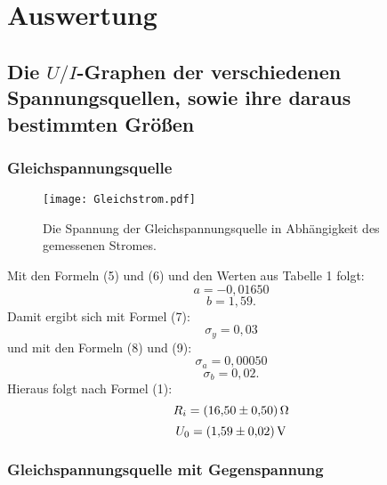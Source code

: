 \section{Auswertung}
\label{sec:Auswertung}



\subsection{Die $U/I$-Graphen der verschiedenen Spannungsquellen, sowie ihre daraus bestimmten Größen}

\subsubsection{Gleichspannungsquelle}
\begin{figure}[H]
	\centering
	\caption{Die Spannung der Gleichspannungsquelle in Abhängigkeit des gemessenen Stromes.}
	\texttt{[image: Gleichstrom.pdf]}
	\label{fig:Gleichstrom}
\end{figure}



Mit den Formeln (5) und (6) und den Werten aus Tabelle 1 folgt:
\begin{displaymath}
	a=-0,01650
\end{displaymath}
\begin{displaymath}
	b=1,59\text{.}
\end{displaymath}
Damit ergibt sich mit Formel (7):
\begin{displaymath}
	\sigma_y=0,03
\end{displaymath}
und mit den Formeln (8) und (9):
\begin{displaymath}
	\sigma_a=0,00050
\end{displaymath}
\begin{displaymath}
	\sigma_b=0,02\text{.}
\end{displaymath}
Hieraus folgt nach Formel (1):
\begin{displaymath}
	R_i= \SI{16,50 \pm 0,50}{\ohm}
\end{displaymath}
\begin{displaymath}
	U_0= \SI{1,59 \pm 0,02}{\volt}
\end{displaymath}


\subsubsection{Gleichspannungsquelle mit Gegenspannung}

